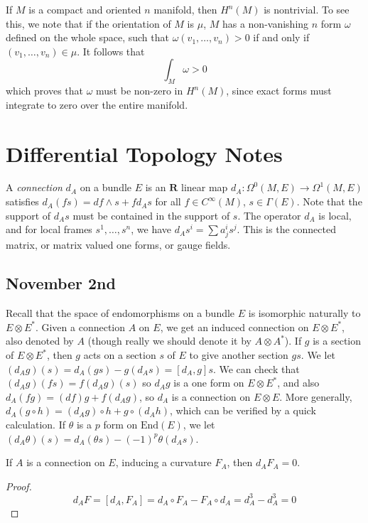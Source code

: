 \begin{example}
    If $M$ is a compact and oriented $n$ manifold, then $H^n(M)$ is nontrivial. To see this, we note that if the orientation of $M$ is $\mu$, $M$ has a non-vanishing $n$ form $\omega$ defined on the whole space, such that $\omega(v_1, \dots, v_n) > 0$ if and only if $(v_1, \dots, v_n) \in \mu$. It follows that
    \[ \int_M \omega > 0 \]
    which proves that $\omega$ must be non-zero in $H^n(M)$, since exact forms must integrate to zero over the entire manifold.
\end{example}



\chapter{Differential Topology Notes}

A \emph{connection} $d_A$ on a bundle $E$ is an $\mathbf{R}$ linear map $d_A: \Omega^0(M,E) \to \Omega^1(M,E)$ satisfies $d_A(fs) = df \wedge s + f d_A s$ for all $f \in C^\infty(M)$, $s \in \Gamma(E)$. Note that the support of $d_A s$ must be contained in the support of $s$. The operator $d_A$ is local, and for local frames $s^1, \dots, s^n$, we have $d_A s^i = \sum a_j^i s^j$. This is the connected matrix, or matrix valued one forms, or gauge fields.


\section{November 2nd}

Recall that the space of endomorphisms on a bundle $E$ is isomorphic naturally to $E \otimes E^*$. Given a connection $A$ on $E$, we get an induced connection on $E \otimes E^*$, also denoted by $A$ (though really we should denote it by $A \otimes A^*$). If $g$ is a section of $E \otimes E^*$, then $g$ acts on a section $s$ of $E$ to give another section $gs$. We let $(d_A g)(s) = d_A(gs) - g(d_A s) = [d_A, g] s$. We can check that $(d_A g)(fs) = f(d_A g)(s)$ so $d_A g$ is a one form on $E \otimes E^*$, and also $d_A(fg) = (df) g + f (d_A g)$, so $d_A$ is a connection on $E \otimes E$. More generally, $d_A(g \circ h) = (d_A g) \circ h + g \circ (d_A h)$, which can be verified by a quick calculation. If $\theta$ is a $p$ form on $\text{End}(E)$, we let $(d_A \theta)(s) = d_A(\theta s) - (-1)^p \theta(d_A s)$.

\begin{theorem}
    If $A$ is a connection on $E$, inducing a curvature $F_A$, then $d_A F_A = 0$.
\end{theorem}
\begin{proof}
    \[ d_A F = [d_A,F_A] = d_A \circ F_A - F_A \circ d_A = d_A^3 - d_A^3 = 0 \]
\end{proof}


